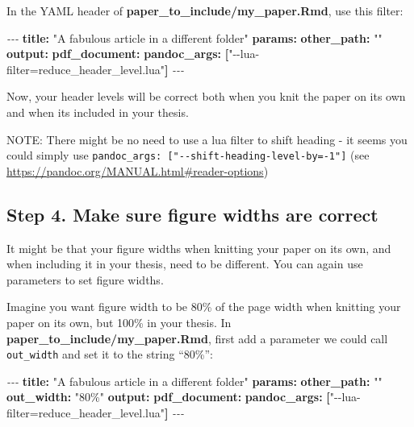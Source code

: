 \documentclass[a4paper, nobind]{templates/ociamthesis}
\newenvironment{Shaded}{\begin{snugshade}}{\end{snugshade}}
\newcommand{\AttributeTok}[1]{\textcolor[rgb]{0.13,0.29,0.53}{#1}}
\newcommand{\FunctionTok}[1]{\textcolor[rgb]{0.13,0.29,0.53}{\textbf{#1}}}
\newcommand{\KeywordTok}[1]{\textcolor[rgb]{0.13,0.29,0.53}{\textbf{#1}}}
\newcommand{\PreprocessorTok}[1]{\textcolor[rgb]{0.56,0.35,0.01}{\textit{#1}}}
\newcommand{\StringTok}[1]{\textcolor[rgb]{0.31,0.60,0.02}{#1}}
\renewenvironment{Shaded}
{
  \vspace{10pt}%
  \begin{snugshade}%
}{%
  \end{snugshade}%
  \vspace{8pt}%
}
\begin{document}
In the YAML header of \textbf{paper\_to\_include/my\_paper.Rmd}, use this filter:

\begin{Shaded}
\begin{Highlighting}[]
\PreprocessorTok{{-}{-}{-}}
\FunctionTok{title}\KeywordTok{:}\AttributeTok{ }\StringTok{"A fabulous article in a different folder"}
\FunctionTok{params}\KeywordTok{:}
\AttributeTok{  }\FunctionTok{other\_path}\KeywordTok{:}\AttributeTok{ }\StringTok{""}
\FunctionTok{output}\KeywordTok{:}
\AttributeTok{  }\FunctionTok{pdf\_document}\KeywordTok{:}\AttributeTok{ }
\AttributeTok{    }\FunctionTok{pandoc\_args}\KeywordTok{:}\AttributeTok{ }\KeywordTok{[}\StringTok{"{-}{-}lua{-}filter=reduce\_header\_level.lua"}\KeywordTok{]}
\PreprocessorTok{{-}{-}{-}}
\end{Highlighting}
\end{Shaded}

Now, your header levels will be correct both when you knit the paper on its own and when its included in your thesis.

NOTE: There might be no need to use a lua filter to shift heading - it seems you could simply use \texttt{pandoc\_args:\ {[}"-\/-shift-heading-level-by=-1"{]}} (see \url{https://pandoc.org/MANUAL.html\#reader-options})

\subsection{Step 4. Make sure figure widths are correct}\label{step-4.-make-sure-figure-widths-are-correct}

It might be that your figure widths when knitting your paper on its own, and when including it in your thesis, need to be different.
You can again use parameters to set figure widths.

Imagine you want figure width to be 80\% of the page width when knitting your paper on its own, but 100\% in your thesis.
In \textbf{paper\_to\_include/my\_paper.Rmd}, first add a parameter we could call \texttt{out\_width} and set it to the string ``80\%'':

\begin{Shaded}
\begin{Highlighting}[]
\PreprocessorTok{{-}{-}{-}}
\FunctionTok{title}\KeywordTok{:}\AttributeTok{ }\StringTok{"A fabulous article in a different folder"}
\FunctionTok{params}\KeywordTok{:}
\AttributeTok{  }\FunctionTok{other\_path}\KeywordTok{:}\AttributeTok{ }\StringTok{""}
\AttributeTok{  }\FunctionTok{out\_width}\KeywordTok{:}\AttributeTok{ }\StringTok{"80\%"}
\FunctionTok{output}\KeywordTok{:}
\AttributeTok{  }\FunctionTok{pdf\_document}\KeywordTok{:}\AttributeTok{ }
\AttributeTok{    }\FunctionTok{pandoc\_args}\KeywordTok{:}\AttributeTok{ }\KeywordTok{[}\StringTok{"{-}{-}lua{-}filter=reduce\_header\_level.lua"}\KeywordTok{]}
\PreprocessorTok{{-}{-}{-}}
\end{Highlighting}
\end{Shaded}
\end{document}

